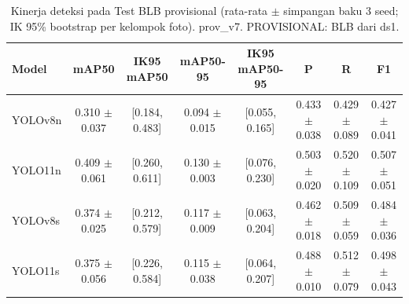 \begin{table}[!t]
\centering
\caption{Kinerja deteksi pada Test BLB provisional (rata-rata $\pm$ simpangan baku 3 seed; IK 95\% bootstrap per kelompok foto). prov\_v7. PROVISIONAL: BLB dari ds1.}
\label{tab:utama_test_blb_provisional}
\footnotesize
\begin{tabular}{lccccccc}
\hline
\textbf{Model} & \textbf{mAP50} & \textbf{IK95 mAP50} & \textbf{mAP50-95} & \textbf{IK95 mAP50-95} & \textbf{P} & \textbf{R} & \textbf{F1} \\
\hline
YOLOv8n & 0.310 $\pm$ 0.037 & [0.184, 0.483] & 0.094 $\pm$ 0.015 & [0.055, 0.165] & 0.433 $\pm$ 0.038 & 0.429 $\pm$ 0.089 & 0.427 $\pm$ 0.041 \\
YOLO11n & 0.409 $\pm$ 0.061 & [0.260, 0.611] & 0.130 $\pm$ 0.003 & [0.076, 0.230] & 0.503 $\pm$ 0.020 & 0.520 $\pm$ 0.109 & 0.507 $\pm$ 0.051 \\
YOLOv8s & 0.374 $\pm$ 0.025 & [0.212, 0.579] & 0.117 $\pm$ 0.009 & [0.063, 0.204] & 0.462 $\pm$ 0.018 & 0.509 $\pm$ 0.059 & 0.484 $\pm$ 0.036 \\
YOLO11s & 0.375 $\pm$ 0.056 & [0.226, 0.584] & 0.115 $\pm$ 0.038 & [0.064, 0.207] & 0.488 $\pm$ 0.010 & 0.512 $\pm$ 0.079 & 0.498 $\pm$ 0.043 \\
\hline
\end{tabular}
\end{table}
